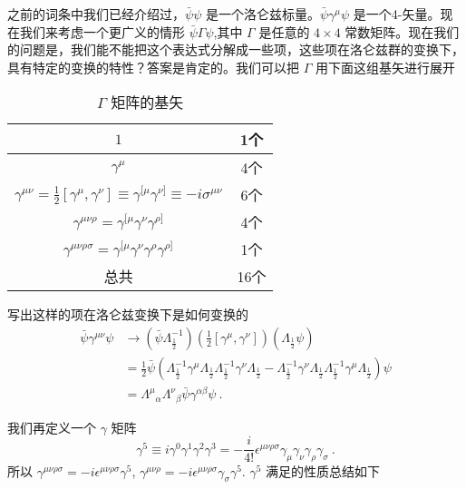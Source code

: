 
之前的词条中我们已经介绍过，$\bar \psi\psi$ 是一个洛仑兹标量。$\bar\psi\gamma^\mu\psi$ 是一个4-矢量。现在我们来考虑一个更广义的情形 $\bar\psi\Gamma\psi$,其中 $\Gamma$ 是任意的 $4\times 4$ 常数矩阵。现在我们的问题是，我们能不能把这个表达式分解成一些项，这些项在洛仑兹群的变换下，具有特定的变换的特性？答案是肯定的。我们可以把 $\Gamma$ 用下面这组基矢进行展开
\begin{table}[ht]
\centering
\caption{$\Gamma$ 矩阵的基矢}\label{tab_diracm_1}
\begin{tabular}{|c|c|}
\hline
$1$ & 1个 \\
\hline
$\gamma^\mu$ & 4个 \\
\hline
$\gamma^{\mu\nu}=\frac{1}{2}[\gamma^\mu,\gamma^\nu]\equiv \gamma^{[\mu}\gamma^{\nu]}\equiv -i\sigma^{\mu\nu}$ & 6个 \\
\hline
$\gamma^{\mu\nu\rho}=\gamma^{[\mu}\gamma^\nu\gamma^{\rho]}$ & 4个 \\
\hline
$\gamma^{\mu\nu\rho\sigma}=\gamma^{[\mu}\gamma^\nu\gamma^\rho\gamma^{\rho]}$ & 1个 \\
\hline
总共 & 16个 \\
\hline
\end{tabular}
\end{table}
\begin{exercise}{写出这样的项在洛仑兹变换下是如何变换的}
\begin{align}\nonumber
\bar\psi\gamma^{\mu\nu}\psi & \rightarrow(\bar\psi\Lambda_{\frac{1}{2}}^{-1})(\frac{1}{2}[\gamma^\mu,\gamma^\nu])(\Lambda_{\frac{1}{2}}\psi)\\
\nonumber
& = \frac{1}{2} \bar\psi (\Lambda_{\frac{1}{2}}^{-1}\gamma^\mu\Lambda_{\frac{1}{2}}\Lambda_{\frac{1}{2}}^{-1}\gamma^\nu\Lambda_{\frac{1}{2}} - \Lambda_{\frac{1}{2}}^{-1}\gamma^\nu\Lambda_{\frac{1}{2}}\Lambda_{\frac{1}{2}}^{-1}\gamma^\mu\Lambda_{\frac{1}{2}})\psi \\
& = \Lambda^\mu{}_\alpha \Lambda^\nu{}_\beta\bar\psi\gamma^{\alpha\beta}\psi~.
\end{align}
\end{exercise}
我们再定义一个 $\gamma$ 矩阵
\begin{equation}
\gamma^5\equiv i \gamma^0 \gamma^1\gamma^2\gamma^3 = -\frac{i}{4!}\epsilon^{\mu\nu\rho\sigma}\gamma_\mu\gamma_\nu\gamma_\rho\gamma_\sigma~.
\end{equation}
所以 $\gamma^{\mu\nu\rho\sigma}=-i\epsilon^{\mu\nu\rho\sigma}\gamma^5$, $\gamma^{\mu\nu\rho} = -i\epsilon^{\mu\nu\rho\sigma}\gamma_\sigma\gamma^5$. $\gamma^5$ 满足的性质总结如下
